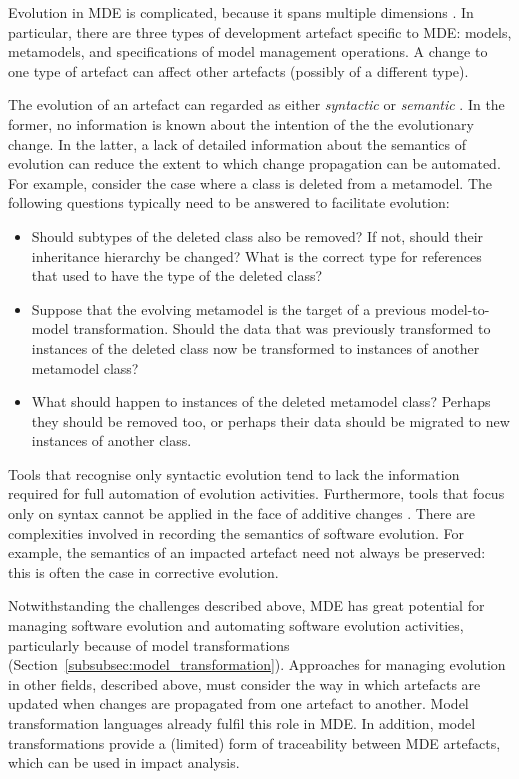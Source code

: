 Evolution \cc in MDE is complicated, because it spans multiple dimensions \cite{deursen07mdse}. In particular, there are three types of development artefact specific to MDE: models, metamodels, and specifications of model management operations. A change to one type of artefact can affect other artefacts (possibly of a different type). 

The \cc evolution of an artefact can regarded as either \emph{syntactic} or \emph{semantic} \cite{sprinkle04domain}. In the former, no information is known about the intention of the the evolutionary change. In the latter, a lack of detailed information about the semantics of evolution can reduce the extent to which change propagation can be automated. For example, consider the case where a class is deleted from a metamodel. The following questions typically need to be answered to facilitate evolution:
 \begin{itemize}
  \item Should subtypes of the deleted class also be removed? If not, should their inheritance hierarchy be changed? What is the correct type for references that used to have the type of the deleted class?
  \item Suppose that the evolving metamodel is the target of a previous model-to-model transformation. Should the data that was previously transformed to instances of the deleted class now be transformed to instances of another metamodel class?
  \item What should happen to instances of the deleted metamodel class? Perhaps they should be removed too, or perhaps their data should be migrated to new instances of another class.
 \end{itemize}

Tools that recognise only syntactic evolution tend to lack the information required for full automation of evolution activities. Furthermore, tools that focus only on syntax cannot be applied in the face of additive changes \cite{gruschko07towards}. There are complexities involved in recording the semantics of software evolution. For example, the semantics of an impacted artefact need not always be preserved: this is often the case in corrective evolution.

Notwithstanding the challenges described above, MDE has great potential for managing software evolution and automating software evolution activities, particularly because of model transformations (Section~\ref{subsubsec:model_transformation}). Approaches for managing evolution in other fields, described above, must consider the way in which artefacts are updated when changes are propagated from one artefact to another. Model transformation languages already fulfil this role in MDE. In addition, model transformations provide a (limited) form of traceability between MDE artefacts, which can be used in impact analysis.

